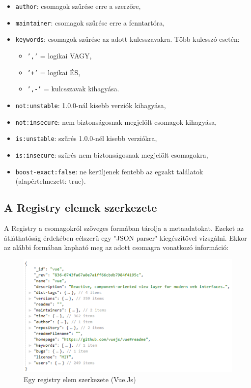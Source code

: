 \begin{itemize}
	\item \texttt{author}: csomagok szűrése erre a szerzőre,
	\item \texttt{maintainer}: csomagok szűrése erre a fenntartóra,
	\item \texttt{keywords}: csomagok szűrése az adott kulcsszavakra. Több kulcsszó esetén:
	\begin{itemize}
		\item \texttt{','} = logikai VAGY,
		\item \texttt{'+'} = logikai ÉS,
		\item \texttt{',-'} = kulcsszavak kihagyása.
	\end{itemize}
	\item \texttt{not:unstable}: 1.0.0-nál kisebb verziók kihagyása,
	\item \texttt{not:insecure}: nem biztonságosnak megjelölt csomagok kihagyása,
	\item \texttt{is:unstable}: szűrés 1.0.0-nél kisebb verziókra,
	\item \texttt{is:insecure}: szűrés nem biztonságosnak megjelölt csomagokra,
	\item \texttt{boost-exact:false}: ne kerüljenek fentebb az egzakt találatok (alapértelmezett: true).
\end{itemize}

\subsection{A Registry elemek szerkezete}

A Registry a csomagokról szöveges formában tárolja a metaadatokat. Ezeket az átláthatóság érdekében célszerű egy "JSON parser" kiegészítővel vizsgálni. Ekkor az alábbi formában kapható meg az adott csomagra vonatkozó információ:

\begin{figure}[h]
	\centering
	\includegraphics[scale=0.75]{images/registry_vue.png}
	\caption{Egy registry elem szerkezete (Vue.Js)}
	\label{fig:registry-package}
\end{figure}

